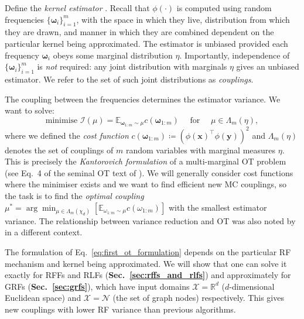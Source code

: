 Define the \emph{kernel estimator} . 
Recall that $\phi(\cdot)$ is computed using random frequencies $\{\boldsymbol{\omega}_i\}_{i=1}^m$, with the space in which they live, distribution from which they are drawn, and manner in which they are combined dependent on the particular kernel being approximated.
The estimator is unbiased provided each frequency $\boldsymbol{\omega}_i$ obeys some marginal distribution $\eta$. 
Importantly, independence of $\{\boldsymbol{\omega}_i\}_{i=1}^m$ is \emph{not} required: any joint distribution with marginals $\eta$ gives an unbiased estimator. We refer to the set of such joint distributions as \emph{couplings}.  

The coupling between the frequencies determines the estimator variance. 
We want to solve:
\begin{equation} \label{eq:first_ot_formulation}
    \textrm{minimise } \mathcal{I}(\mu) =   \mathbb{E}_{\boldsymbol{\omega}_{1:m} \sim \mu}  c(\boldsymbol{\omega}_{1:m}) \quad \textrm{ for } \quad \mu \in \Lambda_m(\eta),
\end{equation}
where we defined the \emph{cost function} $c(\boldsymbol{\omega}_{1:m}) \coloneqq \left( \phi(\boldsymbol{x})^\top \phi(\boldsymbol{y}) \right)^2$ and $\Lambda_m(\eta)$ denotes the set of couplings of $m$ random variables with marginal measures $\eta$. 
This is precisely the \emph{Kantorovich formulation} of a multi-marginal OT problem (see Eq.~4 of the seminal OT text of \citet{villani2021topics}).
We will generally consider cost functions where the minimiser exists and we want to find efficient new MC couplings, so the task is to find the \emph{optimal coupling} $\mu^* = \arg \min_{\mu \in \Lambda_m(\chi_d)} \left [ \mathbb{E}_{\omega_{1:m} \sim \mu}  c(\omega_{1:m}) \right]$ with the smallest estimator variance.
The relationship between variance reduction and OT was also noted by \citet{rowland2018geometrically} in a different context. %

The formulation of Eq.~\ref{eq:first_ot_formulation} depends on the particular RF mechanism and kernel being approximated. 
We will show that one can solve it exactly for RFFs and RLFs (\textbf{Sec.~\ref{sec:rffs_and_rlfs}}) and approximately for GRFs (\textbf{Sec.~\ref{sec:grfs}}), which have input domains $\mathcal{X} = \mathbb{R}^d$ ($d$-dimensional Euclidean space) and $\mathcal{X} = \mathcal{N}$ (the set of graph nodes) respectively.
This gives new couplings with lower RF variance than previous algorithms. 



